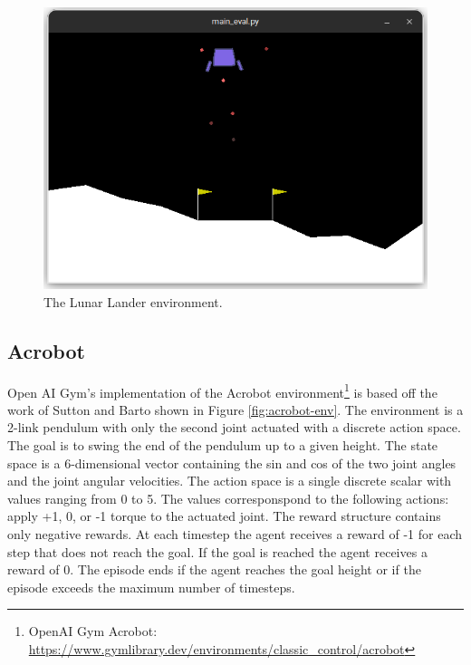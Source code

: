 \begin{figure}[htbp]
    \centerline{\includegraphics[width=\columnwidth]{./img/lunar-lander-env.png}}
    \caption{The Lunar Lander environment.}
    \label{fig:lunar-lander-env}
\end{figure}


\subsection{Acrobot}

Open AI Gym's implementation of the Acrobot
environment\footnote{OpenAI Gym Acrobot: \url{https://www.gymlibrary.dev/environments/classic_control/acrobot}}
is based off the work of Sutton and Barto\cite{sutton2018reinforcement} shown in Figure \ref{fig:acrobot-env}.
The environment is a 2-link pendulum with only the second joint actuated with a discrete action space. The goal is to swing the end of the pendulum up to a given height.
The state space is a 6-dimensional vector containing the sin and cos of the two joint angles and the joint angular velocities.
The action space is a single discrete scalar with values ranging from 0 to 5. The values corresponspond to the following actions:
apply +1, 0, or -1 torque to the actuated joint.
The reward structure contains only negative rewards. At each timestep the agent receives a reward of -1 for each step that does not reach the goal.
If the goal is reached the agent receives a reward of 0. The episode ends if the agent reaches the goal height or if the episode exceeds the maximum number of timesteps.

